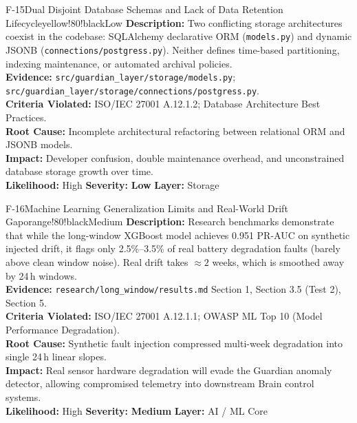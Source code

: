 \documentclass[10pt,a4paper]{report}
\begin{document}
\begin{findingbox}{F-15}{Dual Disjoint Database Schemas and Lack of Data Retention Lifecycle}{yellow!80!black}{Low}
\textbf{Description:} Two conflicting storage architectures coexist in the codebase: SQLAlchemy declarative ORM (\texttt{models.py}) and dynamic JSONB (\texttt{connections/postgress.py}). Neither defines time-based partitioning, indexing maintenance, or automated archival policies.\\
\textbf{Evidence:} \texttt{src/guardian\_layer/storage/models.py}; \texttt{src/guardian\_layer/storage/connections/postgress.py}.\\
\textbf{Criteria Violated:} ISO/IEC 27001 A.12.1.2; Database Architecture Best Practices.\\
\textbf{Root Cause:} Incomplete architectural refactoring between relational ORM and JSONB models.\\
\textbf{Impact:} Developer confusion, double maintenance overhead, and unconstrained database storage growth over time.\\
\textbf{Likelihood:} High \quad \textbar \quad \textbf{Severity:} \textbf{Low} \quad \textbar \quad \textbf{Layer:} Storage
\end{findingbox}

\begin{findingbox}{F-16}{Machine Learning Generalization Limits and Real-World Drift Gap}{orange!80!black}{Medium}
\textbf{Description:} Research benchmarks demonstrate that while the long-window XGBoost model achieves 0.951 PR-AUC on synthetic injected drift, it flags only 2.5\%--3.5\% of real battery degradation faults (barely above clean window noise). Real drift takes $\approx 2$ weeks, which is smoothed away by 24\,h windows.\\
\textbf{Evidence:} \texttt{research/long\_window/results.md} Section 1, Section 3.5 (Test 2), Section 5.\\
\textbf{Criteria Violated:} ISO/IEC 27001 A.12.1.1; OWASP ML Top 10 (Model Performance Degradation).\\
\textbf{Root Cause:} Synthetic fault injection compressed multi-week degradation into single 24\,h linear slopes.\\
\textbf{Impact:} Real sensor hardware degradation will evade the Guardian anomaly detector, allowing compromised telemetry into downstream Brain control systems.\\
\textbf{Likelihood:} High \quad \textbar \quad \textbf{Severity:} \textbf{Medium} \quad \textbar \quad \textbf{Layer:} AI / ML Core
\end{findingbox}
\end{document}
